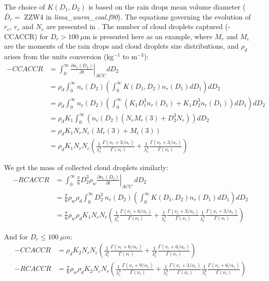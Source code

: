{The choice of $K(D_1,D_2)$ is based on the rain drops mean volume diameter ($\bar{D}_r=$ ZZW4 in \emph{lima\_warm\_coal.f90}). The equations governing the evolution of $r_c$, $r_r$ and $N_c$ are presented in \citet{Cohard2000c2r2}. The number of cloud droplets captured (-CCACCR) for $D_r > 100~\mu$m is presented here as an example, where $M_r$ and $M_c$ are the moments of the rain drops and cloud droplets size distributions, and $\rho_d$ arises from the units conversion (kg$^{-1}$ to m$^{-3}$):
\begin{align}
 -CCACCR &= \int_0^\infty \left. \frac{\partial n_c(D_2)}{\partial t}\right|_{ACC} dD_2 \\
 &= \rho_d \int_0^\infty n_c(D_2) \left( \int_0^\infty K(D_1,D_2)n_r(D_1)dD_1 \right) dD_2 \\
 &= \rho_d \int_0^\infty n_c(D_2) \left( \int_0^\infty \left( K_1 D_1^3 n_r(D_1) + K_1 D_2^3 n_r(D_1) \right) dD_1 \right) dD_2 \\
 &= \rho_d K_1 \int_0^\infty \left( n_c(D_2) \left( N_r M_r(3) + D_2^3 N_r \right) \right) dD_2 \\
 &= \rho_d K_1 N_r N_c \left( M_r(3) + M_c(3) \right) \\
 &= \rho_d K_1 N_r N_c \left( \frac{1}{\lambda_r^3} \frac{\Gamma(\nu_r+3/\alpha_r)}{\Gamma(\nu_r)} + \frac{1}{\lambda_c^3} \frac{\Gamma(\nu_c+3/\alpha_c)}{\Gamma(\nu_c)} \right)
\end{align}

We get the mass of collected cloud droplets similarly:
\begin{align}
 -RCACCR &= \int_0^\infty \frac{\pi}{6} D_2^3 \rho_w \left. \frac{\partial n_c(D_2)}{\partial t}\right|_{ACC} ~dD_2 \\
 &= \frac{\pi}{6} \rho_w \rho_d \int_0^\infty D_2^3 ~ n_c(D_2) \left( \int_0^\infty K(D_1,D_2)n_r(D_1)dD_1 \right) dD_2 \\
 &= \frac{\pi}{6} \rho_w \rho_d K_1 N_c N_r \left( \frac{1}{\lambda_c^6} \frac{\Gamma(\nu_c+6/\alpha_c)}{\Gamma(\nu_c)} + \frac{1}{\lambda_c^3} \frac{\Gamma(\nu_c+3/\alpha_c)}{\Gamma(\nu_c)} \frac{1}{\lambda_r^3} \frac{\Gamma(\nu_r+3/\alpha_r)}{\Gamma(\nu_r)} \right)
\end{align}

And for $D_r \leq 100~\mu m$:
\begin{align}
 -CCACCR &= \rho_d K_2 N_r N_c \left( \frac{1}{\lambda_r^6} \frac{\Gamma(\nu_r+6/\alpha_r)}{\Gamma(\nu_r)} + \frac{1}{\lambda_c^6} \frac{\Gamma(\nu_c+6/\alpha_c)}{\Gamma(\nu_c)} \right) \\
 -RCACCR &= \frac{\pi}{6} \rho_w \rho_d K_2 N_c N_r \left( \frac{1}{\lambda_c^9} \frac{\Gamma(\nu_c+9/\alpha_c)}{\Gamma(\nu_c)} + \frac{1}{\lambda_c^3} \frac{\Gamma(\nu_c+3/\alpha_c)}{\Gamma(\nu_c)} \frac{1}{\lambda_r^6} \frac{\Gamma(\nu_r+6/\alpha_r)}{\Gamma(\nu_r)} \right)
\end{align}

}
